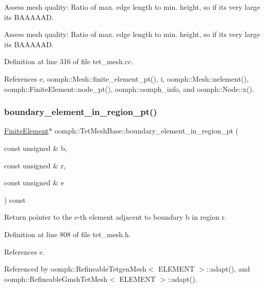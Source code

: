 Assess mesh quality\+: Ratio of max. edge length to min. height, so if it\textquotesingle{}s very large it\textquotesingle{}s B\+A\+A\+A\+A\+AD. 

Assess mesh quality\+: Ratio of max. edge length to min. height, so if it\textquotesingle{}s very large it\textquotesingle{}s B\+A\+A\+A\+A\+AD. 

Definition at line 316 of file tet\+\_\+mesh.\+cc.



References e, oomph\+::\+Mesh\+::finite\+\_\+element\+\_\+pt(), i, oomph\+::\+Mesh\+::nelement(), oomph\+::\+Finite\+Element\+::node\+\_\+pt(), oomph\+::oomph\+\_\+info, and oomph\+::\+Node\+::x().

\mbox{\label{classoomph_1_1TetMeshBase_a895d0c0937ecba9c9872885f8b31bebd}} 
\subsubsection{\texorpdfstring{boundary\+\_\+element\+\_\+in\+\_\+region\+\_\+pt()}{boundary\_element\_in\_region\_pt()}}
{\footnotesize\ttfamily \hyperlink{classoomph_1_1FiniteElement}{Finite\+Element}$\ast$ oomph\+::\+Tet\+Mesh\+Base\+::boundary\+\_\+element\+\_\+in\+\_\+region\+\_\+pt (\begin{DoxyParamCaption}\item[{const unsigned \&}]{b,  }\item[{const unsigned \&}]{r,  }\item[{const unsigned \&}]{e }\end{DoxyParamCaption}) const\hspace{0.3cm}{\ttfamily [inline]}}



Return pointer to the e-\/th element adjacent to boundary b in region r. 



Definition at line 808 of file tet\+\_\+mesh.\+h.



References e.



Referenced by oomph\+::\+Refineable\+Tetgen\+Mesh$<$ E\+L\+E\+M\+E\+N\+T $>$\+::adapt(), and oomph\+::\+Refineable\+Gmsh\+Tet\+Mesh$<$ E\+L\+E\+M\+E\+N\+T $>$\+::adapt().

